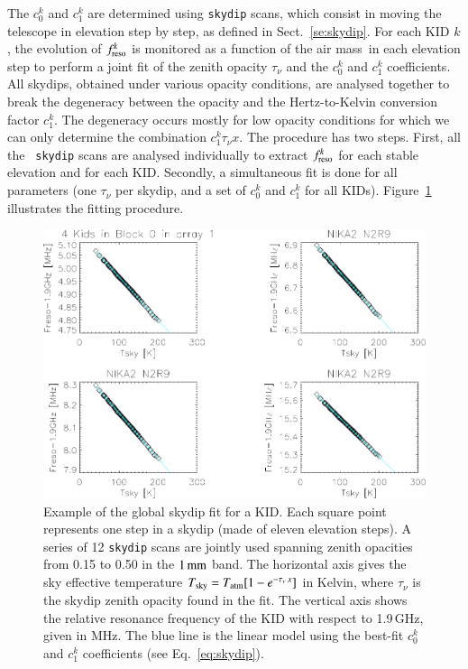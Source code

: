 \documentclass[traditionalabstract]{aa}
\newcommand{\taunu}{\tau_{\nu}}
\newcommand{\airmass}{air mass}
\newcommand{\lp}[1]{#1}
\begin{document}
The $c_0^k$ and $c_1^k$ are determined using {\tt skydip} scans, which
consist in moving the telescope in elevation step by step, as
defined in Sect.~\ref{se:skydip}. For each KID $k$, the evolution
of $f_{\rm{reso}}^k$ is monitored as a function of the \airmass\ in each
elevation step to perform a joint fit of the zenith opacity $\taunu$ and
the $c_0^k$ and $c_1^k$ coefficients.
All skydips, obtained under various opacity conditions, are analysed
together to break the degeneracy between the opacity and the
Hertz-to-Kelvin conversion factor $c_1^k$. The degeneracy occurs mostly for low opacity
conditions for which we can only determine the combination
$c_1^k \taunu x$. The procedure has two steps. First, all the {\tt
skydip} scans are analysed individually to extract $f_{\rm{reso}}^k$ for each
stable elevation and for each KID. Secondly, a simultaneous fit is done
for all parameters (one $\taunu$ per skydip, and a set of $c_0^k$ and
$c_1^k$ for all KIDs). Figure~\ref{fig:skydipfitexample} illustrates the
fitting procedure.
%
\begin{figure}[!htbp]
\begin{center}
\includegraphics[trim={9cm 0cm 0cm 6.5cm}, clip=true, width=0.9\linewidth]{Figures/test_allskd4_N2R9v5_5-crop.pdf}
\caption[]{Example of the global skydip fit for a KID.
Each square point represents one step in a skydip (made of eleven
elevation steps). A series of 12 {\tt skydip} scans are jointly used
spanning zenith opacities from 0.15 to 0.50 {\lp in the $1\,\rm{mm}$ band}. The horizontal axis gives the sky
effective temperature $T_{\rm{sky}} = T_{\rm{atm}}[1-e^{-\taunu\, x}]$ in Kelvin, where $\taunu$ is the
skydip zenith opacity found in the fit. The vertical axis shows the relative
resonance frequency of the KID with respect to 1.9\,GHz, given in MHz. The blue line is the linear
model using the best-fit $c_0^k$ and $c_1^k$ coefficients (see
Eq.~\ref{eq:skydip}).}
\label{fig:skydipfitexample}
\end{center}
\end{figure}
\end{document}
